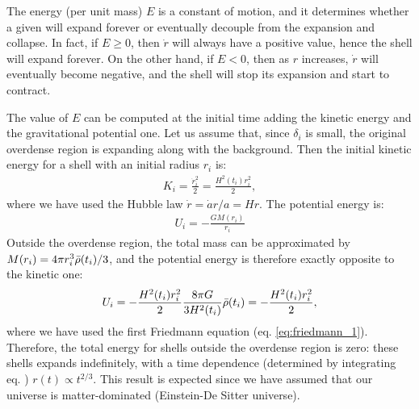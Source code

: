   The energy (per unit mass) $E$ is a constant of motion, and it determines whether a given will expand forever or eventually decouple from the expansion and collapse. In fact, if $E\geq 0$, then $\Dot{r}$ will always have a positive value, hence the shell will expand forever. On the other hand, if $E<0$, then as $r$ increases, $\Dot{r}$ will eventually become negative, and the shell will stop its expansion and start to contract. 
  
  The value of $E$ can be computed at the initial time adding the kinetic energy and the gravitational potential one. Let us assume that, since $\delta_i$ is small, the original overdense region is expanding along with the background. Then the initial kinetic energy for a shell with an initial radius $r_i$ is:
  \begin{align}
   K_i = \frac{\dot{r}_i^2}{2} = \frac{H^2(t_i) r_i^2}{2},
  \end{align}
  where we have used the Hubble law $\Dot{r} = \Dot{a} r/a = Hr$. The potential energy is:
   \begin{align}
   U_i = -\frac{GM(r_i)}{r_i}
  \end{align}
  Outside the overdense region, the total mass can be approximated by $M(r_i) = 4\pi r_i^3 \Bar{\rho}(t_i)/3$, and the potential energy is therefore exactly opposite to the kinetic one:
   \begin{align}
   U_i = -\frac{H^2(t_i)r_i^2}{2}\frac{8\pi G}{3H^2(t_i)}\Bar{\rho}(t_i) = - \frac{H^2(t_i) r_i^2}{2},
  \end{align}
  where we have used the first Friedmann equation (eq. \ref{eq:friedmann_1}). Therefore, the total energy for shells outside the overdense region is zero: these shells expands indefinitely, with a time dependence (determined by integrating eq. ) $r(t)\propto t^{2/3}$. This result is expected since we have assumed that our universe is matter-dominated (Einstein-De Sitter universe).
  
